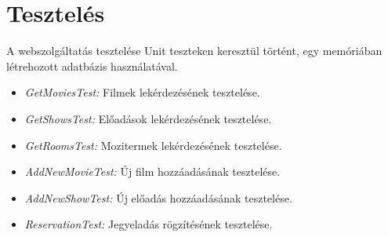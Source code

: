 \documentclass[11pt,a4paper]{article}
\begin{document}
\section{Tesztelés}
A webszolgáltatás tesztelése Unit teszteken keresztül történt, egy memóriában létrehozott
adatbázis használatával.
\begin{itemize}
	\item\textit{GetMoviesTest:} Filmek lekérdezésének tesztelése.
	\item\textit{GetShowsTest:} Előadások lekérdezésének tesztelése.
	\item\textit{GetRoomsTest:} Mozitermek lekérdezésének tesztelése.
	\item\textit{AddNewMovieTest:} Új film hozzáadásának tesztelése.
	\item\textit{AddNewShowTest:} Új előadás hozzáadásának tesztelése.
	\item\textit{ReservationTest:} Jegyeladás rögzítésének tesztelése.
\end{itemize}
\end{document}
